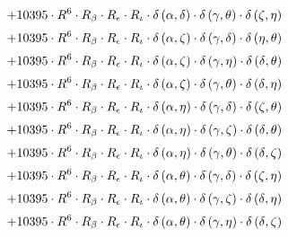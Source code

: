 \begin{subequations}
\begin{gather}
 \\[0.2em] \notag 		 + 10395 \cdot R^{6} \cdot R_{\beta{}} \cdot R_{\epsilon{}} \cdot R_{\iota{}} \cdot \delta{}\left(\alpha{}, \delta{}\right) \cdot \delta{}\left(\gamma{}, \theta{}\right) \cdot \delta{}\left(\zeta{}, \eta{}\right) 
 \\[0.2em] \notag 		 + 10395 \cdot R^{6} \cdot R_{\beta{}} \cdot R_{\epsilon{}} \cdot R_{\iota{}} \cdot \delta{}\left(\alpha{}, \zeta{}\right) \cdot \delta{}\left(\gamma{}, \delta{}\right) \cdot \delta{}\left(\eta{}, \theta{}\right) 
 \\[0.2em] \notag 		 + 10395 \cdot R^{6} \cdot R_{\beta{}} \cdot R_{\epsilon{}} \cdot R_{\iota{}} \cdot \delta{}\left(\alpha{}, \zeta{}\right) \cdot \delta{}\left(\gamma{}, \eta{}\right) \cdot \delta{}\left(\delta{}, \theta{}\right) 
 \\[0.2em] \notag 		 + 10395 \cdot R^{6} \cdot R_{\beta{}} \cdot R_{\epsilon{}} \cdot R_{\iota{}} \cdot \delta{}\left(\alpha{}, \zeta{}\right) \cdot \delta{}\left(\gamma{}, \theta{}\right) \cdot \delta{}\left(\delta{}, \eta{}\right) 
 \\[0.2em] \notag 		 + 10395 \cdot R^{6} \cdot R_{\beta{}} \cdot R_{\epsilon{}} \cdot R_{\iota{}} \cdot \delta{}\left(\alpha{}, \eta{}\right) \cdot \delta{}\left(\gamma{}, \delta{}\right) \cdot \delta{}\left(\zeta{}, \theta{}\right) 
 \\[0.2em] \notag 		 + 10395 \cdot R^{6} \cdot R_{\beta{}} \cdot R_{\epsilon{}} \cdot R_{\iota{}} \cdot \delta{}\left(\alpha{}, \eta{}\right) \cdot \delta{}\left(\gamma{}, \zeta{}\right) \cdot \delta{}\left(\delta{}, \theta{}\right) 
 \\[0.2em] \notag 		 + 10395 \cdot R^{6} \cdot R_{\beta{}} \cdot R_{\epsilon{}} \cdot R_{\iota{}} \cdot \delta{}\left(\alpha{}, \eta{}\right) \cdot \delta{}\left(\gamma{}, \theta{}\right) \cdot \delta{}\left(\delta{}, \zeta{}\right) 
 \\[0.2em] \notag 		 + 10395 \cdot R^{6} \cdot R_{\beta{}} \cdot R_{\epsilon{}} \cdot R_{\iota{}} \cdot \delta{}\left(\alpha{}, \theta{}\right) \cdot \delta{}\left(\gamma{}, \delta{}\right) \cdot \delta{}\left(\zeta{}, \eta{}\right) 
 \\[0.2em] \notag 		 + 10395 \cdot R^{6} \cdot R_{\beta{}} \cdot R_{\epsilon{}} \cdot R_{\iota{}} \cdot \delta{}\left(\alpha{}, \theta{}\right) \cdot \delta{}\left(\gamma{}, \zeta{}\right) \cdot \delta{}\left(\delta{}, \eta{}\right) 
 \\[0.2em] \notag 		 + 10395 \cdot R^{6} \cdot R_{\beta{}} \cdot R_{\epsilon{}} \cdot R_{\iota{}} \cdot \delta{}\left(\alpha{}, \theta{}\right) \cdot \delta{}\left(\gamma{}, \eta{}\right) \cdot \delta{}\left(\delta{}, \zeta{}\right) 

\end{gather}
\end{subequations}
